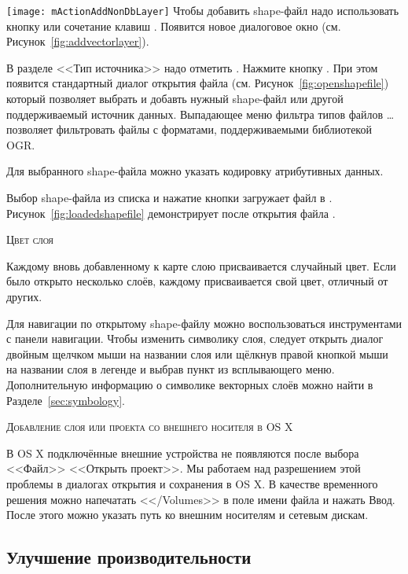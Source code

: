 \texttt{[image: mActionAddNonDbLayer]} Чтобы добавить shape-файл
надо использовать кнопку 
 или сочетание клавиш .
Появится новое диалоговое окно (см. Рисунок~\ref{fig:addvectorlayer}).

В разделе <<Тип источника>> надо отметить . Нажмите
кнопку . При этом появится стандартный диалог открытия файла
(см. Рисунок~\ref{fig:openshapefile}) который позволяет выбрать и добавть
нужный shape-файл или другой поддерживаемый источник данных. Выпадающее меню
фильтра типов файлов \ldots позволяет фильтровать
файлы с форматами, поддерживаемыми библиотекой OGR.

Для выбранного shape-файла можно указать кодировку атрибутивных данных.

Выбор shape-файла из списка и нажатие кнопки  загружает
файл в \qg. Рисунок~\ref{fig:loadedshapefile} демонстрирует \qg после
открытия файла .


\begin{Tip}\caption{\textsc{Цвет слоя}}
Каждому вновь добавленному к карте слою присваивается случайный цвет.
Если было открыто несколько слоёв, каждому присваивается свой цвет,
отличный от других.
\end{Tip}

Для навигации по открытому shape-файлу можно воспользоваться инструментами
с панели навигации. Чтобы изменить символику слоя, следует открыть диалог
 двойным щелчком мыши на названии слоя или щёлкнув
правой кнопкой мыши на названии слоя в легенде и выбрав пункт
 из всплывающего меню. Дополнительную информацию
о символике векторных слоёв можно найти в Разделе~\ref{sec:symbology}.

\begin{Tip}\caption{\textsc{Добавление слоя или проекта со внешнего носителя в OS X}}
В OS X подключённые внешние устройства не появляются после выбора <<Файл>> \arrow
<<Открыть проект>>. Мы работаем над разрешением этой проблемы в диалогах
открытия и сохранения в OS X. В качестве временного решения можно напечатать
<</Volumes>> в поле имени файла и нажать Ввод. После этого можно указать путь
ко внешним носителям и сетевым дискам.
\end{Tip}

\subsection{Улучшение производительности}

